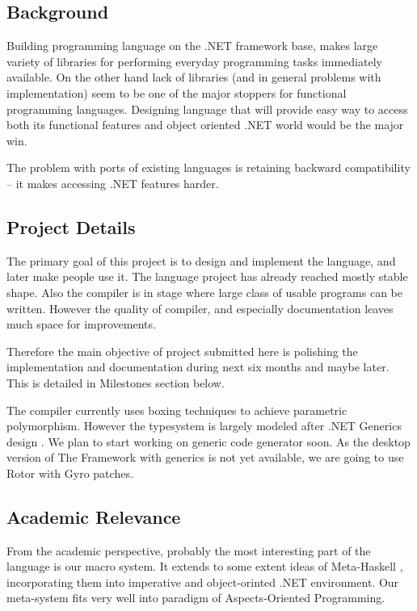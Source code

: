 \documentclass[a4paper,11pt]{article}
\begin{document}
\subsection{Background}
Building programming language on the .NET framework base, makes large
variety of libraries for performing everyday programming tasks immediately
available. On the other hand lack of libraries (and in general problems
with implementation) seem to be one of the major stoppers for functional
programming languages. Designing language that will provide easy way
to access both its functional features and object oriented .NET world
would be the major win.

The problem with ports of existing languages is retaining backward
compatibility -- it makes accessing .NET features harder.


\subsection{Project Details}

The primary goal of this project is to design and implement the language,
and later make people use it. The language project has already reached
mostly stable shape. Also the compiler is in stage where large class of
usable programs can be written. However the quality of compiler, and
especially documentation leaves much space for improvements.

Therefore the main objective of project submitted here is polishing the
implementation and documentation during next six months and maybe later.
This is detailed in Milestones section below.

The compiler currently uses boxing techniques to achieve parametric
polymorphism.  However the typesystem is largely modeled after .NET
Generics design \cite{generics}. We plan to start working on generic code
generator soon. As the desktop version of The Framework with generics
is not yet available, we are going to use Rotor with Gyro patches.


\subsection{Academic Relevance}

From the academic perspective, probably the most interesting part of
the language is our macro system. It extends to some extent
ideas of Meta-Haskell \cite{MetaHaskell}, incorporating them into
imperative and object-orinted .NET environment. Our meta-system fits
very well into paradigm of Aspects-Oriented Programming.
\end{document}
